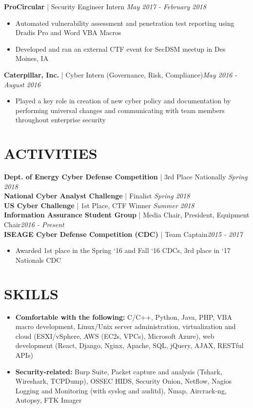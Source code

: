 \documentclass[line]{res}
\begin{document}
\begin{resume}
\textbf{ProCircular} | Security Engineer Intern \hfill \textit{May 2017 - February 2018}
\begin{itemize}
	\item Automated vulnerability assessment and penetration test reporting using Dradis Pro and Word VBA Macros
	\item Developed and ran an external CTF event for SecDSM meetup in Des Moines, IA
\end{itemize}

\textbf{Caterpillar, Inc.} | Cyber Intern (Governance, Risk, Compliance)\hfill \textit{May 2016 - August 2016}
\begin{itemize}
	\item Played a key role in creation of new cyber policy and documentation by performing universal changes and communicating with team members throughout enterprise security
\end{itemize}

\section{ACTIVITIES}
\textbf{Dept. of Energy Cyber Defense Competition} | 3rd Place Nationally \hfill \textit{Spring 2018}\\
\textbf{National Cyber Analyst Challenge} | Finalist \hfill \textit{Spring 2018}\\
\textbf{US Cyber Challenge} | 1st Place, CTF Winner \hfill \textit{Summer 2018}\\
\textbf{Information Assurance Student Group} | Media Chair, President, Equipment Chair\hfill \textit{2016 - Present}\\
\textbf{ISEAGE Cyber Defense Competition (CDC)} | Team Captain\hfill \textit{2015 - 2017}
\begin{itemize}
	\item Awarded 1st place in the Spring ‘16 and Fall ‘16 CDCs, 3rd place in ‘17 Nationals CDC
\end{itemize}

\section{SKILLS}
\begin{itemize}
	\item \textbf{Comfortable with the following:} C/C++, Python, Java, PHP, VBA macro development, Linux/Unix server administration, virtualization and cloud (ESXI/vSphere, AWS (EC2s, VPCs), Microsoft Azure), web development (React, Django, Nginx, Apache, SQL, jQuery, AJAX, RESTful APIs)
	\item \textbf{Security-related:} Burp Suite, Packet capture and analysis (Tshark, Wireshark, TCPDump), OSSEC HIDS, Security Onion, Netflow, Nagios Logging and Monitoring (with syslog and auditd), Nmap, Aircrack-ng, Autopsy, FTK Imager
\end{itemize}

\end{resume}
\end{document}
